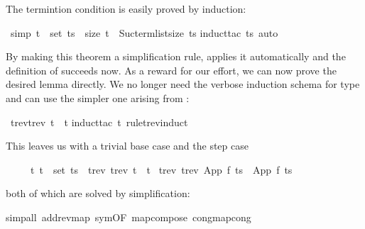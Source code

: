 %
\begin{isabellebody}%
\def\isabellecontext{Nested{\isadigit{2}}}%
%
\begin{isamarkuptext}%
\noindent
The termintion condition is easily proved by induction:%
\end{isamarkuptext}%
\ {\isacharbrackleft}simp{\isacharbrackright}{\isacharcolon}\ {\isachardoublequote}t\ {\isasymin}\ set\ ts\ {\isasymlongrightarrow}\ size\ t\ {\isacharless}\ Suc{\isacharparenleft}term{\isacharunderscore}list{\isacharunderscore}size\ ts{\isacharparenright}{\isachardoublequote}\isanewline
{}induct{\isacharunderscore}tac\ ts{\isacharcomma}\ auto{\isacharparenright}%
\begin{isamarkuptext}%
\noindent
By making this theorem a simplification rule, 
applies it automatically and the definition of 
succeeds now. As a reward for our effort, we can now prove the desired
lemma directly.  We no longer need the verbose
induction schema for type  and can use the simpler one arising from
:%
\end{isamarkuptext}%
\ {\isachardoublequote}trev{\isacharparenleft}trev\ t{\isacharparenright}\ {\isacharequal}\ t{\isachardoublequote}\isanewline
{}induct{\isacharunderscore}tac\ t\ rule{\isacharcolon}trev{\isachardot}induct{\isacharparenright}%
\begin{isamarkuptxt}%
\noindent
This leaves us with a trivial base case  and the step case
\begin{isabelle}%
\ \ \ \ \ {\isasymforall}t{\isachardot}\ t\ {\isasymin}\ set\ ts\ {\isasymlongrightarrow}\ trev\ {\isacharparenleft}trev\ t{\isacharparenright}\ {\isacharequal}\ t\ {\isasymLongrightarrow}\isanewline
\isaindent{\ \ \ \ \ }trev\ {\isacharparenleft}trev\ {\isacharparenleft}App\ f\ ts{\isacharparenright}{\isacharparenright}\ {\isacharequal}\ App\ f\ ts%
\end{isabelle}
both of which are solved by simplification:%
\end{isamarkuptxt}%
simp{\isacharunderscore}all\ add{\isacharcolon}rev{\isacharunderscore}map\ sym{\isacharbrackleft}OF\ map{\isacharunderscore}compose{\isacharbrackright}\ cong{\isacharcolon}map{\isacharunderscore}cong{\isacharparenright}%
\begin{isamarkuptext}%

\end{isamarkuptext}
\end{isabellebody}
